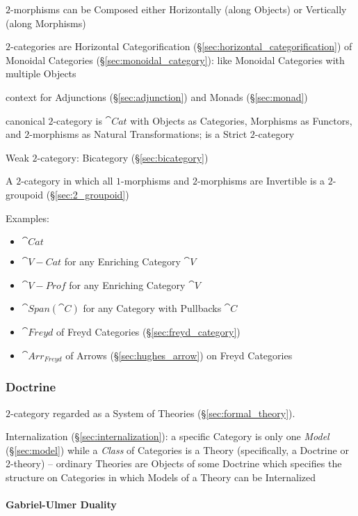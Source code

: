 $2$-morphisms can be Composed either Horizontally (along Objects) or
Vertically (along Morphisms)

$2$-categories are Horizontal Categorification
(\S\ref{sec:horizontal_categorification}) of Monoidal Categories
(\S\ref{sec:monoidal_category}): like Monoidal Categories with
multiple Objects

context for Adjunctions (\S\ref{sec:adjunction}) and Monads
(\S\ref{sec:monad})

canonical $2$-category is $\cat{Cat}$ with Objects as Categories,
Morphisms as Functors, and $2$-morphisms as Natural Transformations;
is a Strict $2$-category

Weak $2$-category: Bicategory (\S\ref{sec:bicategory})

A $2$-category in which all $1$-morphisms and $2$-morphisms are
Invertible is a $2$-groupoid (\S\ref{sec:2_groupoid})

Examples:
\begin{itemize}
\item $\cat{Cat}$
\item $\cat{V-Cat}$ for any Enriching Category $\cat{V}$
\item $\cat{V-Prof}$ for any Enriching Category $\cat{V}$
\item $\cat{Span}(\cat{C})$ for any Category with Pullbacks $\cat{C}$
\item $\cat{Freyd}$ of Freyd Categories (\S\ref{sec:freyd_category})
\item $\cat{Arr_{Freyd}}$ of Arrows (\S\ref{sec:hughes_arrow}) on
  Freyd Categories
\end{itemize}



\subsubsection{Doctrine}\label{sec:doctrine}

$2$-category regarded as a System of Theories
(\S\ref{sec:formal_theory}).

Internalization (\S\ref{sec:internalization}): a specific Category is
only one \emph{Model} (\S\ref{sec:model}) while a \emph{Class} of
Categories is a Theory (specifically, a Doctrine or 2-theory) --
ordinary Theories are Objects of some Doctrine which specifies the
structure on Categories in which Models of a Theory can be Internalized



\paragraph{Gabriel-Ulmer Duality}\label{sec:gabriel_ulmer_duality}
\hfill

